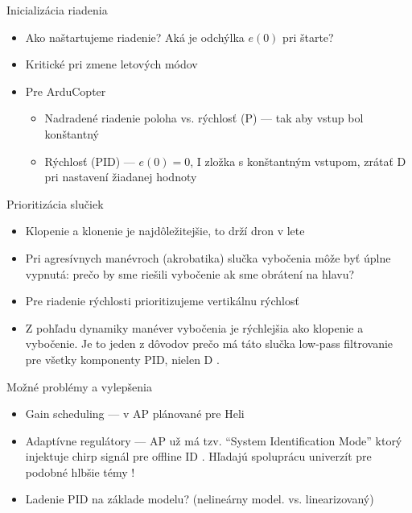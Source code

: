 

\begin{frame}[t]{Inicializácia riadenia}
\begin{itemize}
  \item<1-> Ako naštartujeme riadenie? Aká je odchýlka $e(0)$ pri štarte?
  \item<2-> Kritické pri zmene letových módov \citep{AP:PID,Bresciani2020}
  \item<3-> Pre ArduCopter \citep{AP:PID}
    \begin{itemize}
    \item Nadradené riadenie poloha vs. rýchlosť (P) --- tak aby vstup bol konštantný
    \item Rýchlosť (PID) --- $e(0)=0$, I zložka s konštantným vstupom, zrátať D pri nastavení žiadanej hodnoty
\end{itemize}
\end{itemize}
\end{frame}


\begin{frame}{Prioritizácia slučiek}
\begin{itemize}
  \item<1-> Klopenie a klonenie je najdôležitejšie, to drží dron v lete \citep{AP:PID,Erasmus2020}
  \item<2-> Pri agresívnych manévroch (akrobatika) slučka vybočenia môže byť úplne vypnutá: prečo by sme riešili vybočenie ak sme obrátení na hlavu? \citep{Hall2020}
  \item<3-> Pre riadenie rýchlosti prioritizujeme vertikálnu rýchlosť \citep{Erasmus2020}
  \item<4-> Z pohľadu dynamiky manéver vybočenia je rýchlejšia ako klopenie a vybočenie. Je to jeden z dôvodov prečo má táto slučka low-pass filtrovanie pre všetky komponenty PID, nielen D \citep{Hall2020}.
\end{itemize}
\end{frame}



\begin{frame}{Možné problémy a vylepšenia}
\begin{itemize}
  \item<1-> Gain scheduling --- v AP plánované pre Heli \citep{Hall2020}
  \item<2-> Adaptívne regulátory --- AP už má tzv. ``System Identification Mode'' ktorý injektuje chirp signál pre offline ID \citep{Hall2020}. Hľadajú spoluprácu univerzít pre podobné hlbšie témy \citep{Hall2020}!
  \item<3-> Ladenie PID na základe modelu? (nelineárny model. vs. linearizovaný)
\end{itemize}
\end{frame}


